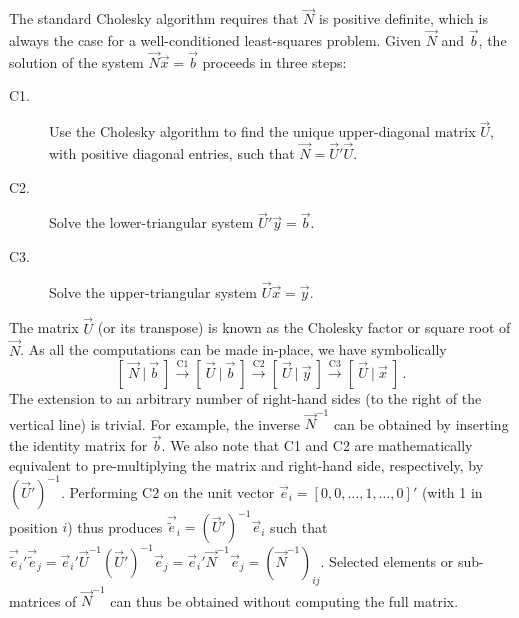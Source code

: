 \documentclass[structabstract]{aa}
\begin{document}
The standard Cholesky algorithm 
\citep[e.g.,][]{book:bjork-1996,golu+96} requires that $\vec{N}$ is
positive definite, which is always the case for a well-conditioned 
least-squares problem. Given $\vec{N}$ and $\vec{b}$, the solution 
of the system $\vec{N}\vec{x}=\vec{b}$ proceeds in three steps:
\begin{description}
\item[C1.]
Use the Cholesky algorithm to find the unique upper-diagonal matrix 
$\vec{U}$, with positive diagonal entries, such that $\vec{N}=\vec{U}'\vec{U}$. 
\item[C2.]
Solve the lower-triangular system $\vec{U}'\vec{y}=\vec{b}$.
\item[C3.]
Solve the upper-triangular system $\vec{U}\vec{x}=\vec{y}$.
\end{description}
The matrix $\vec{U}$ (or its transpose) is known as the Cholesky factor 
or square root of $\vec{N}$. As all the computations can be made 
in-place, we have symbolically
\begin{equation}\label{eq:chol1}
\left[~\vec{N}~|~\vec{b}~\right]  \xrightarrow{\text{C1}}
\left[~\vec{U}~|~\vec{b}~\right]  \xrightarrow{\text{C2}}
\left[~\vec{U}~|~\vec{y}~\right]  \xrightarrow{\text{C3}}
\left[~\vec{U}~|~\vec{x}~\right] \, .
\end{equation}
The extension to an arbitrary number of right-hand sides (to the right of
the vertical line) is trivial. For example, the inverse $\vec{N}^{-1}$ can
be obtained by inserting the identity matrix for $\vec{b}$.
We also note that C1 and C2 are mathematically
equivalent to pre-multiplying the matrix and right-hand side, respectively, 
by $(\vec{U}')^{-1}$. Performing C2 on the unit vector 
$\vec{e}_i=[0,0,\dots,1,\dots,0]'$ (with 1 in position $i$) thus produces 
$\vec{\tilde{e}}_i=(\vec{U}')^{-1}\vec{e}_i$ such that 
$\vec{\tilde{e}}_i'\vec{\tilde{e}}_j=\vec{e}_i'\vec{U}^{-1}(\vec{U}')^{-1}\vec{e}_j
=\vec{e}_i'\vec{N}^{-1}\vec{e}_j=(\vec{N}^{-1})_{ij}$. Selected elements or
sub-matrices of $\vec{N}^{-1}$ can thus be obtained without computing the
full matrix.
\end{document}
